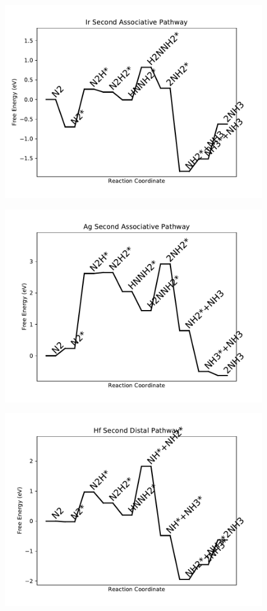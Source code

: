 \begin{figure}
\includegraphics[width=0.8\linewidth]{data/plots/Ir_associative_2.pdf}
\label{fig:Ir_associative_2}
\end{figure}

\begin{figure}
\includegraphics[width=0.8\linewidth]{data/plots/Ag_associative_2.pdf}
\label{fig:Ag_associative_2}
\end{figure}

\begin{figure}
\includegraphics[width=0.8\linewidth]{data/plots/Hf_distal_2.pdf}
\label{fig:Hf_distal_2}
\end{figure}

